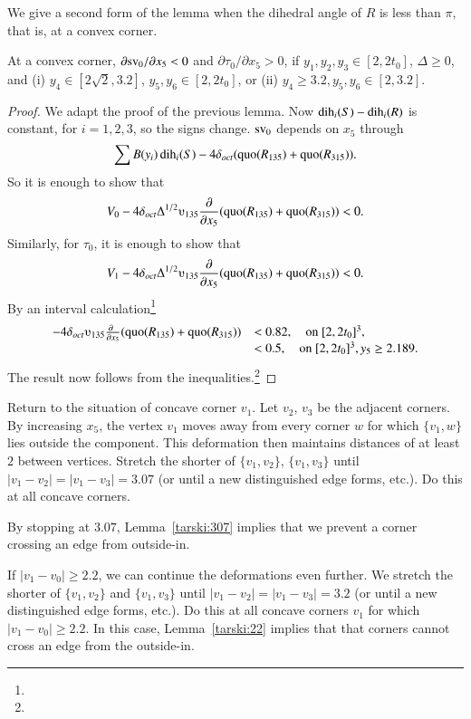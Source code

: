 We give a second form of the lemma when the dihedral angle of $R$ is
less than $\pi$, that is, at a convex corner.

\begin{lemma}\label{lemma:convex-deform-top} 
At a convex corner, $\partial {\operatorname{sv}}_0/\partial x_5 <0$ and
    $\partial \tau_0/\partial x_5>0$, if $y_1,y_2,y_3\in[2,2t_0]$,
$\Delta\ge0$, and (i) $y_4\in[2\sqrt{2},3.2]$, $y_5,y_6\in[2,2t_0]$, or
(ii) $y_4\ge 3.2, y_5,y_6\in[2,3.2]$.
\end{lemma}

\begin{proof}
We adapt the proof of the previous lemma.  Now
$\operatorname{dih}_i(S)-\operatorname{dih}_i(R)$ is constant, for $i=1,2,3$, so the signs change.
${\operatorname{sv}}_0$ depends on $x_5$ through
$$\sum B(y_i)\operatorname{dih}_i(S) - 4\delta_{oct} (\operatorname{quo}(R_{135})+\operatorname{quo}(R_{315})).$$
So it is enough to show that
    $$
    V_0 - 4\doct\Delta^{1/2}\ups_{135}\frac{\partial}{\partial x_5}
    (\quo(R_{135})+\quo(R_{315}))<0.
    $$
Similarly, for $\tau_0$, it is enough to show that
    $$
        V_1 - 4\doct\Delta^{1/2}\ups_{135}\frac{\partial}{\partial x_5}
    (\quo(R_{135})+\quo(R_{315}))<0.
    $$
By an interval calculation\footnote{} %
    $$
    \begin{array}{lll}
    -4\doct  \ups_{135}\frac{\partial\phantom{x}}{\partial x_5}
    (\quo(R_{135})+\quo(R_{315}))&< 0.82,\quad\hbox{on } [2,2t_0]^3,\\
                            &<0.5,\quad\hbox{on }[2,2t_0]^3, y_5\ge2.189.
    \end{array}
    $$
The result now follows from
the inequalities.\footnote{} %
\end{proof}

Return to the situation of concave corner $v_1$. Let $v_2$, $v_3$ be the
adjacent corners. By increasing $x_5$, the vertex $v_1$ moves away from
every corner $w$ for which $\{v_1,w\}$ lies outside the component.  This
deformation then maintains distances of at least $2$ between vertices. 
Stretch the shorter of $\{v_1,v_2\}$,
$\{v_1,v_3\}$ until $|v_1-v_2|=|v_1-v_3|=3.07$ (or until a new
distinguished edge forms, etc.).  Do this at all concave corners.

By stopping at $3.07$, Lemma~\ref{tarski:307} implies that we prevent a corner crossing an edge from
outside-in. 

If $|v_1-v_0|\ge2.2$, we can continue the deformations even further. We
stretch the shorter of $\{v_1,v_2\}$ and $\{v_1,v_3\}$ until
$|v_1-v_2|=|v_1-v_3|=3.2$ (or until a new distinguished edge forms,
etc.).  Do this at all concave corners $v_1$ for which $|v_1-v_0|\ge2.2$.  In this case, Lemma~\ref{tarski:22} implies that that corners cannot cross an edge from the outside-in.

